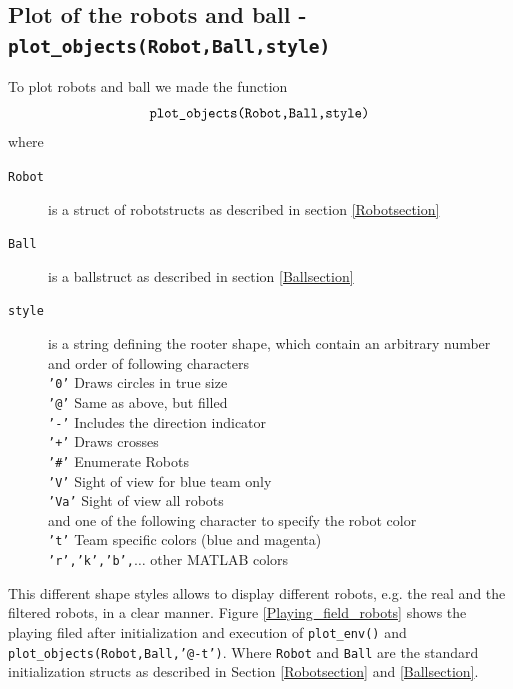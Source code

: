\subsection*{Plot of the robots and ball - \texttt{plot\_objects(Robot,Ball,style)} }
To plot robots and ball we made the function
	\[ \textnormal{\texttt{plot\_objects(Robot,Ball,style)}}
	\]
where
\begin{description}
	\item[\texttt{Robot}] is a struct of robotstructs as described in section \ref{Robotsection}
	\item[\texttt{Ball}] is a ballstruct as described in section \ref{Ballsection}
	\item[\texttt{style}] is a string defining the rooter shape, which contain an arbitrary number and order of following characters\\
		\texttt{'0'} Draws circles in true size \\
		\texttt{'@'} Same as above, but filled \\
		\texttt{'-'} Includes the direction indicator\\
		\texttt{'+'} Draws crosses\\
		\texttt{'\#'} Enumerate Robots\\
		\texttt{'V'} Sight of view for blue team only\\
		\texttt{'Va'} Sight of view all robots \vspace{0.2cm} \\ 
		and one of the following character to specify the robot color\\
		\texttt{'t'} Team specific colors (blue and magenta) \\
		\texttt{'r','k','b',$\ldots$} other MATLAB colors
\end{description}
This different shape styles allows to display different robots, e.g. the real and the filtered robots, in a clear manner. 
Figure \ref{Playing_field_robots} shows the playing filed after initialization and execution of \texttt{plot\_env()} and \texttt{plot\_objects(Robot,Ball,'@-t')}. Where \texttt{Robot} and \texttt{Ball} are the standard initialization structs as described in Section \ref{Robotsection} and \ref{Ballsection}.

